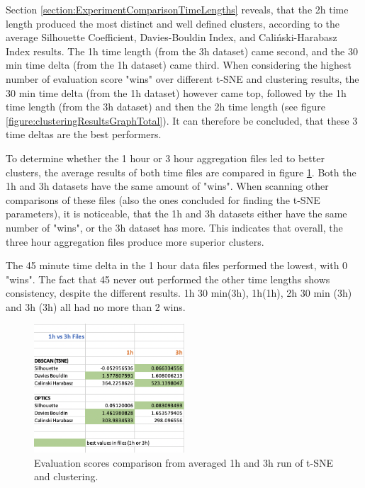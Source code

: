 
Section \ref{section:ExperimentComparisonTimeLengths} reveals, that the 2h time length produced the most distinct and well defined clusters, according to the average Silhouette Coefficient, Davies-Bouldin Index, and Caliński-Harabasz Index results. The 1h time length (from the 3h dataset) came second, and the 30 min time delta (from the 1h dataset) came third. When considering the highest number of evaluation score "wins" over different t-SNE and clustering results, the 30 min time delta (from the 1h dataset) however came top, followed by the 1h time length (from the 3h dataset) and then the 2h time length (see figure \ref{figure:clusteringResultsGraphTotal}). It can therefore be concluded, that these 3 time deltas are the best performers.

To determine whether the 1 hour or 3 hour aggregation files led to better clusters, the average results of both time files are compared in figure \ref{figure:clusteringResults7}. Both the 1h and 3h datasets have the same amount of "wins". When scanning other comparisons of these files (also the ones concluded for finding the t-SNE parameters), it is noticeable, that the 1h and 3h datasets either have the same number of "wins", or the 3h dataset has more. This indicates that overall, the three hour aggregation files produce more superior clusters.


The 45 minute time delta in the 1 hour data files performed the lowest, with 0 "wins". The fact that 45 never out performed the other time lengths shows consistency, despite the different results. 1h 30 min(3h), 1h(1h), 2h 30 min (3h) and 3h (3h) all had no more than 2 wins. 


\begin{figure}
  \centering
  \includegraphics[width=0.5\textwidth]{./images/clusteringResults/clusteringResults7.png}
  \caption{Evaluation scores comparison from averaged 1h and 3h run of t-SNE and clustering.}
  \label{figure:clusteringResults7}
\end{figure}


